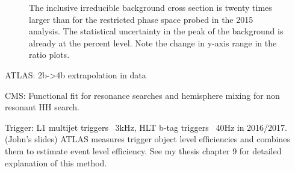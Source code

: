 \begin{figure}
  \begin{center}
    \hfill
    \caption{The inclusive irreducible background cross section is twenty times larger than for the restricted phase space probed in the 2015 analysis.
    The statistical uncertainty in the peak of the background is already at the percent level. Note the change in y-axis range in the ratio plots.}
  \label{fig:2015vs20184b}
  \end{center}
\end{figure}

ATLAS: 2b->4b extrapolation in data

CMS: Functional fit for resonance searches and hemisphere mixing for non resonant HH search.

Trigger: L1 multijet triggers ~3kHz, HLT b-tag triggers ~40Hz in 2016/2017. (John’s slides) ATLAS measures trigger object level efficiencies and combines them to estimate event level efficiency. See my thesis chapter 9 for detailed explanation of this method.

